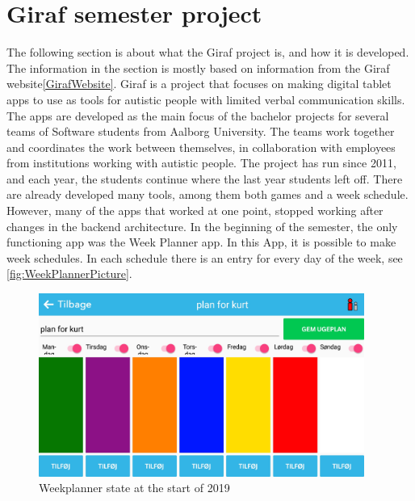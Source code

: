 \section{Giraf semester project} %
\label{cha:Giraf semester project}

The following section is about what the Giraf project is, and how it is developed. The information in the section is mostly based on information from the Giraf website\ref{GirafWebsite}.
Giraf is a project that focuses on making digital tablet apps to use as tools for autistic people with limited verbal communication skills. The apps are developed as the main focus of the bachelor projects for several teams of Software students from Aalborg University. The teams work together and coordinates the work between themselves, in collaboration with employees from institutions working with  autistic people. The project has run since 2011, and each year, the students continue where the last year students left off. 
There are already developed many tools, among them both games and a week schedule. However, many of the apps that worked at one point, stopped working after changes in the backend architecture\cite{AppsStatus2019}. 
In the beginning of the semester, the only functioning app was the Week Planner app\cite{AppsStatus2019}. In this App, it is possible to make week schedules. In each schedule there is an entry for every day of the week, see \autoref{fig:WeekPlannerPicture}. 

\begin{figure}[h]
        \begin{center}
            \includegraphics[width=0.95\textwidth]{figures/WeekPlannerPicture}
        \end{center}
        \caption{Weekplanner state at the start of 2019}
        \label{fig:WeekPlannerPicture}
\end{figure}

